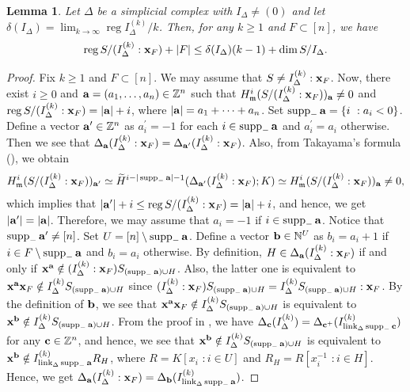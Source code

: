 \documentclass[12pt]{amsart}
\newtheorem{lemma}[thm]{Lemma}
\theoremstyle{definition}
\theoremstyle{remark}
\DeclareMathOperator{\link}{link}
\DeclareMathOperator{\supp}{supp}
\DeclareMathOperator{\reg}{reg}
\begin{document}
\begin{lemma}\label{lemma3}
Let $\Delta$ be a simplicial complex with $I_{\Delta}\neq(0)$ and let $\delta(I_{\Delta})=\lim_{k\rightarrow\infty}\reg I_{\Delta}^{(k)}/k$. Then, for any $k\geq1$ and $F\subset[n]$, we have 
$$\reg S/(I_{\Delta}^{(k)}:{\bf x}_{F})+|F|\leq\delta(I_{\Delta})(k-1)+\dim S/I_{\Delta}.$$
\end{lemma}
\begin{proof}
Fix $k\geq1$ and $F\subset[n]$. We may assume that $S\neq I_{\Delta}^{(k)}:{\bf x}_{F}$. Now, there exist $i\geq0$ and ${\bf a}=(a_{1},\ldots, a_{n})\in\mathbb{Z}^{n}$ such that $H_{\mathfrak{m}}^{i}(S/(I_{\Delta}^{(k)}:{\bf x}_{F}))_{\bf a}\neq0$ and $\reg S/(I_{\Delta}^{(k)}:{\bf x}_{F})=|{\bf a}|+i$, where $|{\bf a}|=a_{1}+\cdots+a_{n}$. Set $\supp_{-}{\bf a}=\{i\,\,: a_{i}<0\}$. Define a vector ${\bf a^{\prime}}\in\mathbb{Z}^{n}$ as $a_{i}^{\prime}=-1$ for each $i\in\supp_{-}{\bf a}$ and $a_{i}^{\prime}=a_{i}$ otherwise. Then we see that $\Delta_{\bf a}(I_{\Delta}^{(k)}:{\bf x}_{F})=\Delta_{\bf a^{\prime}}(I_{\Delta}^{(k)}:{\bf x}_{F})$. Also, from Takayama's formula (\cite[Theorem 1]{t2005}), we obtain $$H_{\mathfrak{m}}^{i}(S/(I_{\Delta}^{(k)}:{\bf x}_{F}))_{\bf a^{\prime}}\simeq\widetilde{H}^{i-|\supp_{-}{\bf a}|-1}(\Delta_{\bf a^{\prime}}(I_{\Delta}^{(k)}:{\bf x}_{F});K)\simeq H_{\mathfrak{m}}^{i}(S/(I_{\Delta}^{(k)}:{\bf x}_{F}))_{\bf a}\neq0,$$which implies that $|{\bf a^{\prime}}|+i\leq\reg S/(I_{\Delta}^{(k)}:{\bf x}_{F})=|{\bf a}|+i$, and hence, we get $|{\bf a^{\prime}}|=|{\bf a}|$. Therefore, we may assume that $a_{i}=-1$ if $i\in\supp_{-}{\bf a}$. Notice that $\supp_{-}{\bf a^{\prime}}\neq[n]$. Set $U=[n]\setminus\supp_{-}{\bf a}$. Define a vector ${\bf b}\in\mathbb{N}^{U}$ as $b_{i}=a_{i}+1$ if $i\in F\setminus\supp_{-}{\bf a}$ and $b_{i}=a_{i}$ otherwise. By definition, $H\in\Delta_{\bf a}(I_{\Delta}^{(k)}:{\bf x}_{F})$ if and only if ${\bf x}^{\bf a}\notin (I_{\Delta}^{(k)}:{\bf x}_{F})S_{(\supp_{-}{\bf a})\cup H}$. Also, the latter one is equivalent to ${\bf x}^{\bf a}{\bf x}_{F}\notin I_{\Delta}^{(k)}S_{(\supp_{-}{\bf a})\cup H}$ since $(I_{\Delta}^{(k)}:{\bf x}_{F})S_{(\supp_{-}{\bf a})\cup H}=I_{\Delta}^{(k)}S_{(\supp_{-}{\bf a)}\cup H}:{\bf x}_{F}$. By the definition of ${\bf b}$, we see that ${\bf x}^{\bf a}{\bf x}_{F}\notin I_{\Delta}^{(k)}S_{(\supp_{-}{\bf a})\cup H}$ is equivalent to ${\bf x}^{\bf b}\notin I_{\Delta}^{(k)}S_{(\supp_{-}{\bf a})\cup H}$. From the proof in \cite[Theorem 3.2]{kmt2025}, we have $\Delta_{\bf c}(I_{\Delta}^{(k)})=\Delta_{\bf c^{+}}(I_{\link_{\Delta}\supp_{-}{\bf c}}^{(k)})$ for any ${\bf c}\in\mathbb{Z}^{n}$, and hence, we see that ${\bf x}^{\bf b}\notin I_{\Delta}^{(k)}S_{(\supp_{-}{\bf a})\cup H}$ is equivalent to ${\bf x}^{\bf b}\notin I_{\link_{\Delta}{\supp_{-}{\bf a}}}^{(k)}R_{H}$, where $R=K[x_{i}\,\,: i\in U]$ and $R_{H}=R[x_{i}^{-1}\,\,: i\in H]$. Hence, we get $\Delta_{\bf a}(I_{\Delta}^{(k)}:{\bf x}_{F})=\Delta_{\bf b}(I_{\link_{\Delta}\supp_{-}{\bf a}}^{(k)})$. 

\end{proof}
\end{document}
